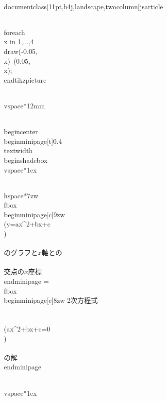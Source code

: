 \\documentclass[11pt,b4j,landscape,twocolumn]{jsarticle}
\begin{document}
\\foreach \\x in {1,...,4}{\\draw(-0.05,\\x)--(0.05,\\x);}
\\end{tikzpicture}

\\vspace*{12mm}

\\begin{center}
\\begin{minipage}[t]{0.4\\textwidth}
\\begin{shadebox}
\\vspace*{1ex}

\\hspace*{7zw}\\fbox{\\begin{minipage}[c]{9zw}
\\(y=ax^2+bx+c\\)\\\\
のグラフと$x$軸との\\\\
交点の$x$座標
\\end{minipage}}
=
\\fbox{\\begin{minipage}[c]{8zw}
2次方程式\\\\
\\(ax^2+bx+c=0\\)\\\\
の解
\\end{minipage}}

\\vspace*{1ex}
\end{document}
